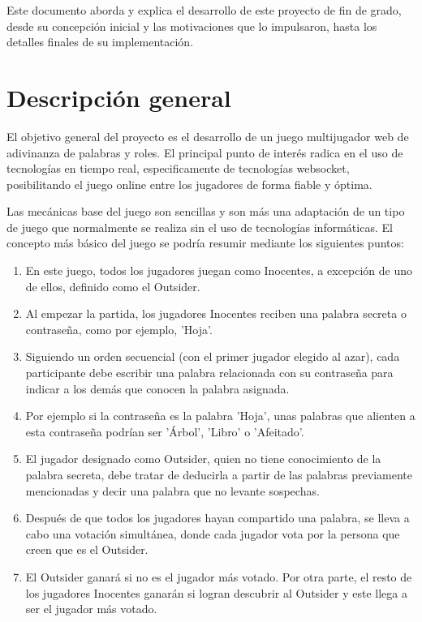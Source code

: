 Este documento aborda y explica el desarrollo de este proyecto de fin de grado,
desde su concepción inicial y las motivaciones que lo impulsaron, hasta los detalles
finales de su implementación.

\section{Descripción general}

El objetivo general del proyecto es el desarrollo de un juego multijugador web de adivinanza de palabras y roles. El principal punto de interés
radica en el uso de tecnologías en tiempo real, especificamente de tecnologías websocket, posibilitando el juego online entre los jugadores
de forma fiable y óptima.

Las mecánicas base del juego son sencillas y son más una adaptación de un tipo de juego que normalmente se realiza sin el uso de tecnologías informáticas.
El concepto más básico del juego se podría resumir mediante los siguientes puntos:

\begin{enumerate}
	\item En este juego, todos los jugadores juegan como
	      Inocentes, a excepción de uno de ellos,
	      definido como el Outsider.
	\item Al empezar la partida, los jugadores
	      Inocentes reciben una
	      palabra secreta o contraseña, como por ejemplo, 'Hoja'.
	\item  Siguiendo un orden secuencial (con el primer jugador elegido al azar), cada
	      participante debe escribir una palabra relacionada con su contraseña
	      para indicar a los demás que conocen la palabra asignada.
	\item Por ejemplo si la contraseña es la palabra 'Hoja', unas palabras que
	      alienten a esta contraseña podrían ser 'Árbol', 'Libro' o 'Afeitado'.
	\item El jugador designado como Outsider, quien no tiene conocimiento de la palabra secreta, debe tratar de deducirla a partir de las palabras
	      previamente mencionadas y decir una palabra que no levante sospechas.
	\item Después de que todos los jugadores hayan compartido una palabra, se lleva a cabo una votación simultánea, donde cada jugador vota por la persona que creen
	      que es el Outsider.
	\item El Outsider ganará si no es el jugador más votado. Por otra parte, el resto de los jugadores Inocentes ganarán
	      si logran descubrir al Outsider y este llega a ser el jugador más votado.
\end{enumerate}

